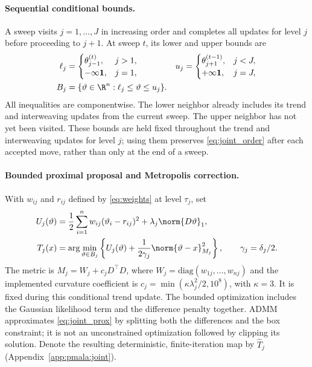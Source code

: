 \paragraph{Sequential conditional bounds.} A sweep visits $j=1,\ldots,J$ in increasing order and completes all updates for level $j$ before proceeding to $j+1$. At sweep $t$, its lower and upper bounds are
\begin{equation}
\begin{aligned}
    \ell_j &= \begin{cases}\theta_{j-1}^{(t)}, & j>1,\\ -\infty\mathbf 1, & j=1,\end{cases}
    & u_j &= \begin{cases}\theta_{j+1}^{(t-1)}, & j<J,\\ +\infty\mathbf 1, & j=J,\end{cases} \\
    B_j &= \{\vartheta\in\R^n:\ell_j\leq\vartheta\leq u_j\}.
\end{aligned}
    \label{eq:joint_box}
\end{equation}
All inequalities are componentwise. The lower neighbor already includes its trend and interweaving updates from the current sweep. The upper neighbor has not yet been visited. These bounds are held fixed throughout the trend and interweaving updates for level $j$; using them preserves \eqref{eq:joint_order} after each accepted move, rather than only at the end of a sweep.

\paragraph{Bounded proximal proposal and Metropolis correction.} With $w_{ij}$ and $r_{ij}$ defined by \eqref{eq:weights} at level $\tau_j$, set
\begin{equation}
\begin{aligned}
    U_j(\vartheta) &= \frac12\sum_{i=1}^n w_{ij}(\vartheta_i-r_{ij})^2
                    +\lambda_j\norm{D\vartheta}_1,\\
    T_j(x) &= \arg\min_{\vartheta\in B_j}
             \left\{U_j(\vartheta)+\frac{1}{2\gamma_j}\norm{\vartheta-x}_{M_j}^2\right\},
             \qquad \gamma_j=\delta_j/2.
\end{aligned}
    \label{eq:joint_prox}
\end{equation}
The metric is $M_j=W_j+c_jD^\top D$, where $W_j=\mathrm{diag}(w_{1j},\ldots,w_{nj})$ and the implemented curvature coefficient is $c_j=\min(\kappa\lambda_j^2/2,10^8)$, with $\kappa=3$. It is fixed during this conditional trend update. The bounded optimization includes the Gaussian likelihood term and the difference penalty together. ADMM approximates \eqref{eq:joint_prox} by splitting both the differences and the box constraint; it is not an unconstrained optimization followed by clipping its solution. Denote the resulting deterministic, finite-iteration map by $\widehat T_j$ (Appendix~\ref{app:pmala:joint}).

